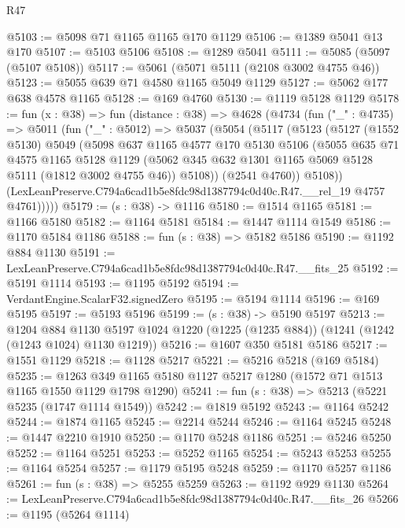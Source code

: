 \begin{lexlean}{R47}
\begin{coremodule}
@5103 := @5098 @71 @1165 @1165 @170 @1129
@5106 := @1389 @5041 @13 @170
@5107 := @5103 @5106
@5108 := @1289 @5041
@5111 := @5085 (@5097 (@5107 @5108))
@5117 := @5061 (@5071 @5111 (@2108 @3002 @4755 @46))
@5123 := @5055 @639 @71 @4580 @1165 @5049 @1129
@5127 := @5062 @177 @638 @4578 @1165
@5128 := @169 @4760
@5130 := @1119 @5128 @1129
@5178 := fun (x : @38) =>
  fun (distance : @38) =>
  @4628
    (@4734
      (fun ("_" : @4735) =>
      @5011
        (fun ("_" : @5012) =>
        @5037
          (@5054
            (@5117
              (@5123
                (@5127
                  (@1552 @5130)
                  @5049
                  (@5098
                    @637
                    @1165
                    @4577
                    @170
                    @5130
                    @5106
                    (@5055
                      @635
                      @71
                      @4575
                      @1165
                      @5128
                      @1129
                      (@5062 @345 @632 @1301 @1165 @5069 @5128 @5111 (@1812 @3002 @4755 @46))
                      @5108))
                  (@2541 @4760))
                @5108))
            (LexLeanPreserve.C794a6cad1b5e8fdc98d1387794c0d40c.R47.__rel_19 @4757 @4761)))))
@5179 := (s : @38) -> @1116
@5180 := @1514 @1165
@5181 := @1166 @5180
@5182 := @1164 @5181
@5184 := @1447 @1114 @1549
@5186 := @1170 @5184 @1186
@5188 := fun (s : @38) => @5182 @5186
@5190 := @1192 @884 @1130
@5191 := LexLeanPreserve.C794a6cad1b5e8fdc98d1387794c0d40c.R47.__fits_25
@5192 := @5191 @1114
@5193 := @1195 @5192
@5194 := VerdantEngine.ScalarF32.signedZero
@5195 := @5194 @1114
@5196 := @169 @5195
@5197 := @5193 @5196
@5199 := (s : @38) -> @5190 @5197
@5213 := @1204
    @884
    @1130
    @5197
    @1024
    @1220
    (@1225 (@1235 @884))
    (@1241 (@1242 (@1243 @1024) @1130 @1219))
@5216 := @1607 @350 @5181 @5186
@5217 := @1551 @1129
@5218 := @1128 @5217
@5221 := @5216 @5218 (@169 @5184)
@5235 := @1263 @349 @1165 @5180 @1127 @5217 @1280 (@1572 @71 @1513 @1165 @1550 @1129 @1798 @1290)
@5241 := fun (s : @38) => @5213 (@5221 @5235 (@1747 @1114 @1549))
@5242 := @1819 @5192
@5243 := @1164 @5242
@5244 := @1874 @1165
@5245 := @2214 @5244
@5246 := @1164 @5245
@5248 := @1447 @2210 @1910
@5250 := @1170 @5248 @1186
@5251 := @5246 @5250
@5252 := @1164 @5251
@5253 := @5252 @1165
@5254 := @5243 @5253
@5255 := @1164 @5254
@5257 := @1179 @5195 @5248
@5259 := @1170 @5257 @1186
@5261 := fun (s : @38) => @5255 @5259
@5263 := @1192 @929 @1130
@5264 := LexLeanPreserve.C794a6cad1b5e8fdc98d1387794c0d40c.R47.__fits_26
@5266 := @1195 (@5264 @1114)

\end{coremodule}
\end{lexlean}
